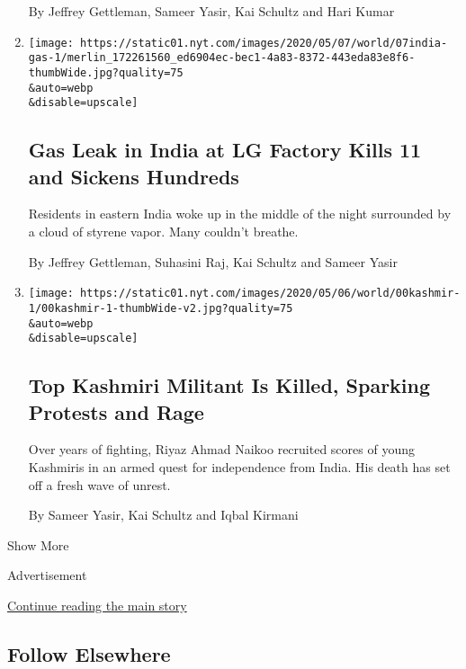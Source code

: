 \begin{enumerate}
  By Jeffrey Gettleman, Sameer Yasir, Kai Schultz and Hari Kumar
\item
  \href{/2020/05/07/world/asia/india-lg-gas.html}{}

  \texttt{[image: https://static01.nyt.com/images/2020/05/07/world/07india-gas-1/merlin\_172261560\_ed6904ec-bec1-4a83-8372-443eda83e8f6-thumbWide.jpg?quality=75\\\&auto=webp\\\&disable=upscale]}

  \hypertarget{gas-leak-in-india-at-lg-factory-kills-11-and-sickens-hundreds}{%
  \subsection{Gas Leak in India at LG Factory Kills 11 and Sickens
  Hundreds}\label{gas-leak-in-india-at-lg-factory-kills-11-and-sickens-hundreds}}

  Residents in eastern India woke up in the middle of the night
  surrounded by a cloud of styrene vapor. Many couldn't breathe.

  By Jeffrey Gettleman, Suhasini Raj, Kai Schultz and Sameer Yasir
\item
  \href{/2020/05/06/world/asia/india-pakistan-kashmir-riyaz-ahmad-naikoo.html}{}

  \texttt{[image: https://static01.nyt.com/images/2020/05/06/world/00kashmir-1/00kashmir-1-thumbWide-v2.jpg?quality=75\\\&auto=webp\\\&disable=upscale]}

  \hypertarget{top-kashmiri-militant-is-killed-sparking-protests-and-rage}{%
  \subsection{Top Kashmiri Militant Is Killed, Sparking Protests and
  Rage}\label{top-kashmiri-militant-is-killed-sparking-protests-and-rage}}

  Over years of fighting, Riyaz Ahmad Naikoo recruited scores of young
  Kashmiris in an armed quest for independence from India. His death has
  set off a fresh wave of unrest.

  By Sameer Yasir, Kai Schultz and Iqbal Kirmani
\end{enumerate}

Show More

Advertisement

\protect\hyperlink{after-mid2}{Continue reading the main story}

\hypertarget{follow-elsewhere}{%
\subsection{Follow Elsewhere}\label{follow-elsewhere}}

